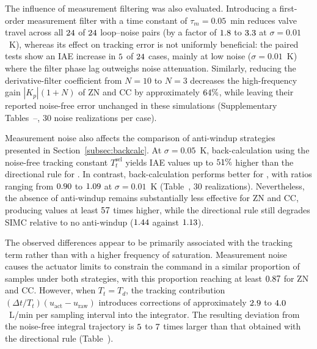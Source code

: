 The influence of measurement filtering was also evaluated. Introducing a first-order measurement filter with a time constant of $\tau_m = 0.05$~min reduces valve travel across all $24$ of $24$ loop--noise pairs (by a factor of $1.8$ to $3.3$ at $\sigma = 0.01$~K), whereas its effect on tracking error is not uniformly beneficial: the paired tests show an IAE increase in $5$ of $24$ cases, mainly at low noise ($\sigma = 0.01$~K) where the filter phase lag outweighs noise attenuation. Similarly, reducing the derivative-filter coefficient from $N = 10$ to $N = 3$ decreases the high-frequency gain $|K_p|(1+N)$ of ZN and CC by approximately $64\%$, while leaving their reported noise-free error unchanged in these simulations (Supplementary Tables~--, $30$ noise realizations per case).

Measurement noise also affects the comparison of anti-windup strategies presented in Section~\ref{subsec:backcalc}. At $\sigma = 0.05$~K, back-calculation using the noise-free tracking constant $T_t^{\mathrm{sel}}$ yields IAE values up to $51\%$ higher than the directional rule for \vnzbcworse{}. In contrast, back-calculation performs better for \vnzbcbetter{}, with ratios ranging from $0.90$ to $1.09$ at $\sigma = 0.01$~K (Table~, $30$ realizations). Nevertheless, the absence of anti-windup remains substantially less effective for ZN and CC, producing values at least $57$ times higher, while the directional rule still degrades SIMC relative to no anti-windup ($1.44$ against $1.13$).

The observed differences appear to be primarily associated with the tracking term rather than with a higher frequency of saturation. Measurement noise causes the actuator limits to constrain the command in a similar proportion of samples under both strategies, with this proportion reaching at least $0.87$ for ZN and CC. However, when $T_t = T_d$, the tracking contribution $(\Delta t/T_t)(u_{\mathrm{act}} - u_{\mathrm{raw}})$ introduces corrections of approximately $2.9$ to $4.0$~L/min per sampling interval into the integrator. The resulting deviation from the noise-free integral trajectory is $5$ to $7$ times larger than that obtained with the directional rule (Table~).

